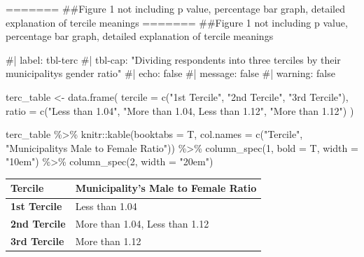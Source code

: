 \documentclass[
]{article}
\newenvironment{Shaded}{\begin{snugshade}}{\end{snugshade}}
\newcommand{\AttributeTok}[1]{\textcolor[rgb]{0.40,0.45,0.13}{#1}}
\newcommand{\CommentTok}[1]{\textcolor[rgb]{0.37,0.37,0.37}{#1}}
\newcommand{\DecValTok}[1]{\textcolor[rgb]{0.68,0.00,0.00}{#1}}
\newcommand{\FunctionTok}[1]{\textcolor[rgb]{0.28,0.35,0.67}{#1}}
\newcommand{\NormalTok}[1]{\textcolor[rgb]{0.00,0.23,0.31}{#1}}
\newcommand{\OtherTok}[1]{\textcolor[rgb]{0.00,0.23,0.31}{#1}}
\newcommand{\SpecialCharTok}[1]{\textcolor[rgb]{0.37,0.37,0.37}{#1}}
\newcommand{\StringTok}[1]{\textcolor[rgb]{0.13,0.47,0.30}{#1}}
\begin{document}
======= \#\#Figure 1 not including p value, percentage bar graph,
detailed explanation of tercile meanings ======= \#\#Figure 1 not
including p value, percentage bar graph, detailed explanation of tercile
meanings

\clearpage

\renewcommand{\arraystretch}{2}

\begin{Shaded}
\begin{Highlighting}[]
\CommentTok{\#| label: tbl{-}terc}
\CommentTok{\#| tbl{-}cap: "Dividing respondents into three terciles by their municipality\textquotesingle{}s gender ratio"}
\CommentTok{\#| echo: false}
\CommentTok{\#| message: false}
\CommentTok{\#| warning: false}

\NormalTok{terc\_table }\OtherTok{\textless{}{-}} \FunctionTok{data.frame}\NormalTok{(}
  \AttributeTok{tercile =} \FunctionTok{c}\NormalTok{(}\StringTok{"1st Tercile"}\NormalTok{, }\StringTok{"2nd Tercile"}\NormalTok{, }\StringTok{"3rd Tercile"}\NormalTok{),}
  \AttributeTok{ratio =} \FunctionTok{c}\NormalTok{(}\StringTok{"Less than 1.04"}\NormalTok{, }
               \StringTok{"More than 1.04, Less than 1.12"}\NormalTok{,}
               \StringTok{"More than 1.12"}\NormalTok{)}
\NormalTok{)}

\NormalTok{terc\_table }\SpecialCharTok{\%\textgreater{}\%} 
\NormalTok{  knitr}\SpecialCharTok{::}\FunctionTok{kable}\NormalTok{(}\AttributeTok{booktabs =}\NormalTok{ T, }\AttributeTok{col.names =} \FunctionTok{c}\NormalTok{(}\StringTok{"Tercile"}\NormalTok{, }\StringTok{"Municipality\textquotesingle{}s Male to Female Ratio"}\NormalTok{)) }\SpecialCharTok{\%\textgreater{}\%} 
  \FunctionTok{column\_spec}\NormalTok{(}\DecValTok{1}\NormalTok{, }\AttributeTok{bold =}\NormalTok{ T, }\AttributeTok{width =} \StringTok{"10em"}\NormalTok{) }\SpecialCharTok{\%\textgreater{}\%}
  \FunctionTok{column\_spec}\NormalTok{(}\DecValTok{2}\NormalTok{, }\AttributeTok{width =} \StringTok{"20em"}\NormalTok{)}
\end{Highlighting}
\end{Shaded}

\begin{tabular}{>{\raggedright\arraybackslash}p{10em}>{\raggedright\arraybackslash}p{20em}}
\toprule
Tercile & Municipality's Male to Female Ratio\\
\midrule
\textbf{1st Tercile} & Less than 1.04\\
\textbf{2nd Tercile} & More than 1.04, Less than 1.12\\
\textbf{3rd Tercile} & More than 1.12\\
\bottomrule
\end{tabular}
\end{document}
